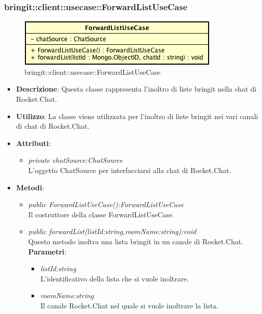 \subsubsection{bringit::client::usecase::ForwardListUseCase}

\label{bringit::client::usecase::ForwardListUseCase}
\begin{figure}[H]
	\centering
	\includegraphics[scale=0.5]{Sezioni/SottosezioniST/img/app/ForwardListUseCase.png}
	\caption{bringit::client::usecase::ForwardListUseCase}
\end{figure}

\begin{itemize}
\item \textbf{Descrizione}: Questa classe rappresenta l'inoltro di liste bringit nella chat di Rocket.Chat.
\item \textbf{Utilizzo}: La classe viene utilizzata per l'inoltro di liste bringit nei vari canali di chat di Rocket.Chat.
\item \textbf{Attributi}: 
	\begin{itemize}
	\item \textit{private chatSource:ChatSource}\\
	L'oggetto ChatSource per interfacciarsi alla chat di Rocket.Chat.
	\end{itemize}
\item \textbf{Metodi}:
	\begin{itemize}
	\item \textit{public ForwardListUseCase():ForwardListUseCase}\\
	Il costruttore della classe ForwardListUseCase.
	\item \textit{public forwardList(listId:string,roomName:string):void}\\
	Questo metodo inoltra una lista bringit in un canale di Rocket.Chat.
			\\ \textbf{Parametri}: \begin{itemize}
				\item \textit{listId:string}\\
				L'identificativo della lista che si vuole inoltrare.
				\item \textit{roomName:string}\\
				Il canale Rocket.Chat nel quale si vuole inoltrare la lista.
			\end{itemize}
	\end{itemize}
\end{itemize} 

